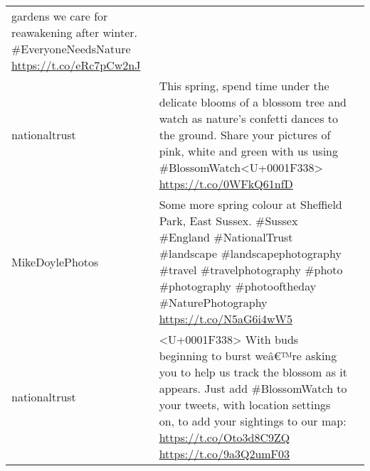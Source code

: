 \documentclass[
]{article}
\begin{document}
\begin{longtable}[]{@{}llr@{}}
\begin{minipage}[t]{0.49\columnwidth}
gardens we care for reawakening after winter. \#EveryoneNeedsNature
\url{https://t.co/eRc7pCw2nJ}\strut
\end{minipage} & \begin{minipage}[t]{0.21\columnwidth}\raggedleft
318\strut
\end{minipage}\tabularnewline
\begin{minipage}[t]{0.22\columnwidth}\raggedright
nationaltrust\strut
\end{minipage} & \begin{minipage}[t]{0.49\columnwidth}\raggedright
This spring, spend time under the delicate blooms of a blossom tree and
watch as nature's confetti dances to the ground. Share your pictures of
pink, white and green with us using
\#BlossomWatch\textless U+0001F338\textgreater{}
\url{https://t.co/0WFkQ61nfD}\strut
\end{minipage} & \begin{minipage}[t]{0.21\columnwidth}\raggedleft
278\strut
\end{minipage}\tabularnewline
\begin{minipage}[t]{0.22\columnwidth}\raggedright
MikeDoylePhotos\strut
\end{minipage} & \begin{minipage}[t]{0.49\columnwidth}\raggedright
Some more spring colour at Sheffield Park, East Sussex. \#Sussex
\#England \#NationalTrust \#landscape \#landscapephotography \#travel
\#travelphotography \#photo \#photography \#photooftheday
\#NaturePhotography \url{https://t.co/N5aG6i4wW5}\strut
\end{minipage} & \begin{minipage}[t]{0.21\columnwidth}\raggedleft
228\strut
\end{minipage}\tabularnewline
\begin{minipage}[t]{0.22\columnwidth}\raggedright
nationaltrust\strut
\end{minipage} & \begin{minipage}[t]{0.49\columnwidth}\raggedright
\textless U+0001F338\textgreater{} With buds beginning to burst weâ€™re
asking you to help us track the blossom as it appears. Just add
\#BlossomWatch to your tweets, with location settings on, to add your
sightings to our map: \url{https://t.co/Oto3d8C9ZQ}
\url{https://t.co/9a3Q2umF03}\strut
\end{minipage} & \begin{minipage}[t]{0.21\columnwidth}\raggedleft
210\strut
\end{minipage}\tabularnewline
\bottomrule
\end{longtable}
\end{document}
